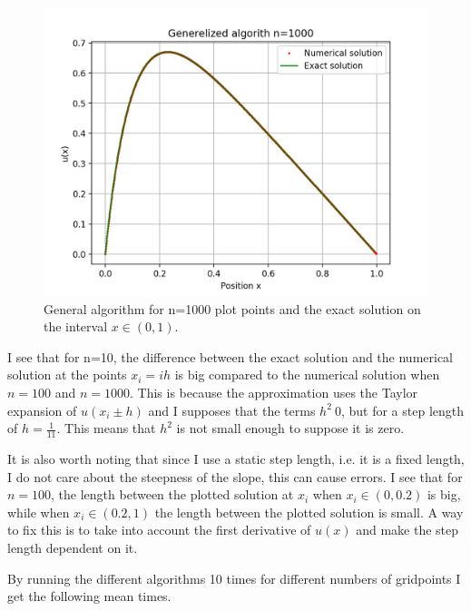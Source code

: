 \documentclass[12pt]{article}
\begin{document}
\begin{figure}[H]
  \center
  \includegraphics[scale=0.5]{alg-0-n1000plot.png}
  \caption{General algorithm for n=1000 plot points and the exact solution on the interval $x\in (0,1)$.}
  \label{fig:plotn1000}
\end{figure}

I see that for n=10, the difference between the exact solution and the numerical solution at the points $x_i=ih$ is big compared to the numerical solution when $n=100$ and $n=1000$. This is because the approximation uses the Taylor expansion of $u(x_i\pm h)$ and I supposes that the terms $h^2~0$, but for a step length of $h=\frac{1}{11}$. This means that $h^2$ is not small enough to suppose it is zero.

It is also worth noting that since I use a static step length, i.e. it is a fixed length, I do not care about the steepness of the slope, this can cause errors. I see that for $n=100$, the length between the plotted solution at $x_i$ when $x_i\in (0,0.2)$ is big, while when $x_i\in (0.2,1)$ the length between the plotted solution is small. A way to fix this is to take into account the first derivative of $u(x)$ and make the step length dependent on it.

By running the different algorithms 10 times for different numbers of gridpoints I get the following mean times.
\hfill\break

\end{document}
